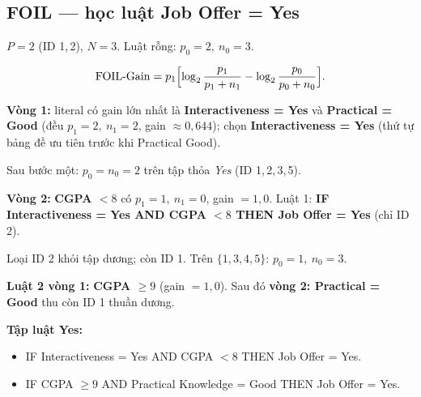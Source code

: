 \subsection*{FOIL --- học luật Job Offer = Yes}

\(P=2\) (ID 1,\,2), \(N=3\). Luật rỗng: \(p_0=2,\ n_0=3\).

\[
\mathrm{FOIL\text{-}Gain}=p_1\Bigl[\log_2\frac{p_1}{p_1+n_1}-\log_2\frac{p_0}{p_0+n_0}\Bigr].
\]

\textbf{Vòng 1:} literal có gain lớn nhất là \textbf{Interactiveness = Yes} và \textbf{Practical = Good} (đều \(p_1=2,\ n_1=2\), gain \(\approx 0{,}644\)); chọn \textbf{Interactiveness = Yes} (thứ tự bảng đề ưu tiên trước khi Practical Good).

Sau bước một: \(p_0=n_0=2\) trên tập thỏa \emph{Yes} (ID 1,\,2,\,3,\,5).

\textbf{Vòng 2:} \textbf{CGPA $<8$} có \(p_1=1,\ n_1=0\), gain \(=1{,}0\). Luật 1: \textbf{IF Interactiveness = Yes AND CGPA $<8$ THEN Job Offer = Yes} (chỉ ID 2).

Loại ID 2 khỏi tập dương; còn ID 1. Trên \(\{1,3,4,5\}\): \(p_0=1,\ n_0=3\).

\textbf{Luật 2 vòng 1:} \textbf{CGPA \(\ge 9\)} (gain \(=1{,}0\)). Sau đó \textbf{vòng 2: Practical = Good} thu còn ID 1 thuần dương.

\medskip
\noindent\textbf{Tập luật Yes:}
\begin{itemize}\setlength\itemsep{0pt}
  \item IF Interactiveness = Yes AND CGPA $<8$ THEN Job Offer = Yes.
  \item IF CGPA $\ge 9$ AND Practical Knowledge = Good THEN Job Offer = Yes.
\end{itemize}
